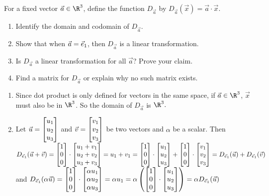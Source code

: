 \begin{exercises}
\begin{problist}
		\prob For a fixed vector $\vec a\in\R^3$, define the function $D_{\vec a}$ by
		$D_{\vec a}(\vec x) = \vec a\cdot\vec x$.
		\begin{enumerate}
			\item Identify the domain and codomain of $D_{\vec a}$.
			\item Show that when $\vec a={\vec e_1}$, then $D_{\vec a}$ is a linear transformation.
			\item Is $D_{\vec a}$ a linear transformation for all $\vec a$? Prove your claim.
			\item Find a matrix for $D_{\vec a}$ or explain why no such matrix exists.
		\end{enumerate}
		\begin{solution}
			\begin{enumerate}
				\item Since dot product is only defined for vectors in the same space, if $\vec{a} \in \R^3$, $\vec{x}$ must also be in $\R^3$. So the domain of $D_{\vec{a}}$ is $\R^3.$
				\item Let $\vec{u} = \mat{u_1\\u_2\\u_3}$ and $\vec{v} = \mat{v_1 \\ v_2\\v_3}$ be two vectors and $\alpha$ be a scalar. Then $D_{\vec{e}_1} (\vec{u}+ \vec{v}) = \mat{1\\0\\0} \cdot \mat{u_1 + v_1 \\ u_2 + v_2 \\ u_3+v_3} = u_1 + v_1 =  \mat{1\\0\\0} \cdot \mat{u_1 \\ u_2\\u_3} +  \mat{1\\0\\0} \cdot \mat{v_1 \\ v_2\\v_3} = D_{\vec{e}_1}(\vec{u}) + D_{\vec{e}_1}(\vec{v})$ and
$D_{\vec{e}_1}(\alpha \vec{u}) = \mat{1\\0\\0} \cdot \mat{\alpha u_1 \\ \alpha u_2\\ \alpha u_3} = \alpha u_1 = \alpha \left( \mat{1\\0\\0} \cdot \mat{u_1 \\ u_2\\u_3} \right) = \alpha D_{\vec{e}_1}(\vec{u})$

\end{enumerate}
\end{solution}
\end{problist}
\end{exercises}

